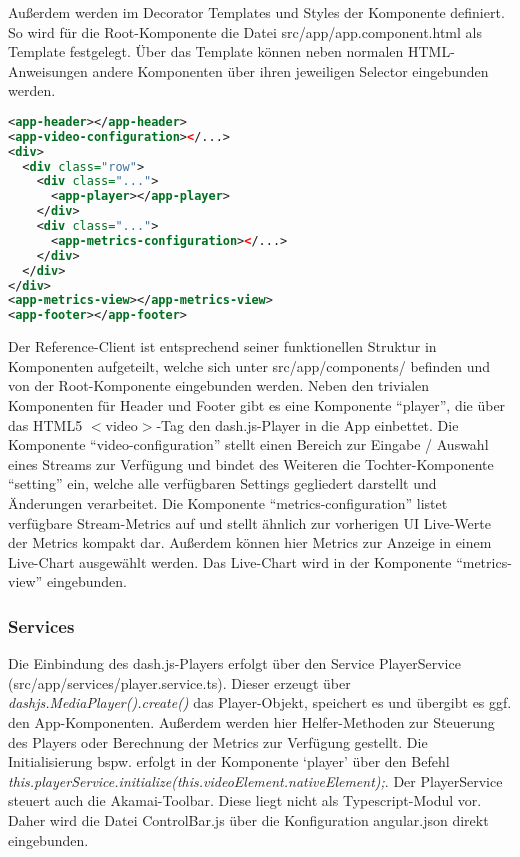 \documentclass[conference]{IEEEtran}
\begin{document}
Außerdem werden im Decorator Templates und Styles der Komponente definiert. So wird für die Root-Komponente die Datei src/app/app.component.html als Template festgelegt. Über das Template können neben normalen HTML-Anweisungen andere Komponenten über ihren jeweiligen Selector eingebunden werden.

\begin{lstlisting}[language=xml, caption=Template der Root-Komponente=\small]
<app-header></app-header>
<app-video-configuration></...>
<div>
  <div class="row">
    <div class="...">
      <app-player></app-player>
    </div>
    <div class="...">
      <app-metrics-configuration></...>
    </div>
  </div>
</div>
<app-metrics-view></app-metrics-view>
<app-footer></app-footer>
\end{lstlisting}


Der Reference-Client ist entsprechend seiner funktionellen Struktur in Komponenten aufgeteilt, welche sich unter src/app/components/ befinden und von der Root-Komponente eingebunden werden. Neben den trivialen Komponenten für Header und Footer gibt es eine Komponente ``player'', die über das HTML5 $<$video$>$-Tag den dash.js-Player in die App einbettet. Die Komponente ``video-configuration'' stellt einen Bereich zur Eingabe / Auswahl eines Streams zur Verfügung und bindet des Weiteren die Tochter-Komponente ``setting'' ein, welche alle verfügbaren Settings gegliedert darstellt und Änderungen verarbeitet. Die Komponente ``metrics-configuration'' listet verfügbare Stream-Metrics auf und stellt ähnlich zur vorherigen UI Live-Werte der Metrics kompakt dar. Außerdem können hier Metrics zur Anzeige in einem Live-Chart ausgewählt werden. Das Live-Chart wird in der Komponente ``metrics-view'' eingebunden.

\subsubsection{Services}
Die Einbindung des dash.js-Players erfolgt über den Service PlayerService (src/app/services/player.service.ts). Dieser erzeugt über \emph{dashjs.MediaPlayer().create()} das Player-Objekt, speichert es und übergibt es ggf. den App-Komponenten. Außerdem werden hier Helfer-Methoden zur Steuerung des Players oder Berechnung der Metrics zur Verfügung gestellt. Die Initialisierung bspw. erfolgt in der Komponente `player' über den Befehl \emph{this.playerService.initialize(this.videoElement.nativeElement);}. Der PlayerService steuert auch die Akamai-Toolbar. Diese liegt nicht als Typescript-Modul vor. Daher wird die Datei ControlBar.js über die Konfiguration angular.json direkt eingebunden.
\end{document}
